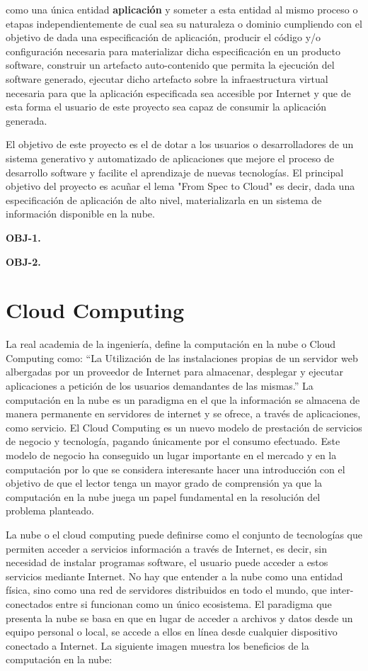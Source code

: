 \documentclass[a4paper,11pt]{book}
\begin{document}
como una única  entidad \textbf{aplicación} y  someter a esta entidad al mismo proceso o etapas independientemente de cual sea su naturaleza o dominio cumpliendo con el objetivo de dada una especificación de aplicación, producir el código y/o configuración necesaria para materializar dicha especificación en un producto software, construir un artefacto auto-contenido que permita la ejecución del software generado, ejecutar dicho artefacto sobre la infraestructura virtual necesaria para que la aplicación especificada sea accesible por Internet y que de esta forma el usuario de este proyecto sea capaz de consumir la aplicación generada.  
 
El objetivo de este proyecto es el de dotar a los usuarios o desarrolladores de un  sistema  generativo y automatizado de aplicaciones que mejore el proceso de desarrollo software y facilite el aprendizaje de nuevas tecnologías. El principal objetivo del proyecto es acuñar el lema "From Spec to Cloud" es decir, dada una especificación de aplicación de alto nivel, materializarla en un sistema de información disponible en la nube. 

 

\textbf{OBJ-1.} 

\textbf{OBJ-2.}


\section{Cloud Computing}


La real academia de la ingeniería, define la computación en la nube o Cloud Computing  como: “La Utilización de las instalaciones propias de un servidor web albergadas por un proveedor de Internet para almacenar, desplegar y ejecutar aplicaciones a petición de los usuarios demandantes de las mismas.”\cite{RAI} La computación en la nube es un paradigma en el que la información se almacena de manera permanente en servidores de internet y se ofrece, a través de aplicaciones, como servicio. El Cloud Computing es un nuevo modelo de prestación de servicios\cite{magazine} de negocio y tecnología, pagando únicamente por el consumo efectuado. Este modelo de negocio ha conseguido un lugar importante en el mercado y en la computación  por lo que se considera  interesante hacer una introducción con el objetivo de que el lector tenga un mayor grado de comprensión ya que la computación en la nube juega un papel fundamental en la resolución  del problema planteado.   

La nube  o el cloud computing  puede definirse  como el conjunto de tecnologías que permiten acceder a servicios información a través de Internet, es decir, sin necesidad de instalar programas software, el usuario puede acceder a estos servicios mediante Internet. No hay que entender a la nube como una entidad física, sino como una red de servidores distribuidos en todo el mundo, que inter-conectados entre si funcionan como un único ecosistema.  El paradigma que presenta la nube se basa en que en lugar de acceder a archivos y datos desde un equipo personal o local, se accede a ellos en línea desde cualquier dispositivo conectado a Internet. La siguiente imagen muestra los beneficios de la computación en la nube:
\end{document}
